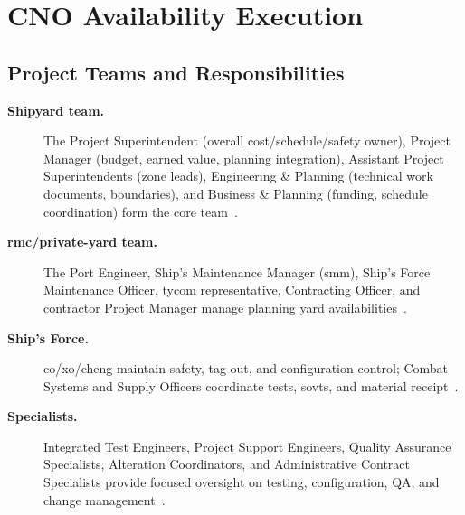 \documentclass[../main.tex]{subfiles}
\begin{document}
\section{CNO Availability Execution}

\subsection{Project Teams and Responsibilities}
\begin{description}
  \item[\textbf{Shipyard team.}] The Project Superintendent (overall cost/schedule/safety owner), Project Manager (budget, earned value, planning integration), Assistant Project Superintendents (zone leads), Engineering \& Planning (technical work documents, boundaries), and Business \& Planning (funding, schedule coordination) form the core team~\autocite{edo-4-2-2-cno-availability-execution-2025}.
  \item[\textbf{\ac{rmc}/private-yard team.}] The Port Engineer, Ship's Maintenance Manager (\ac{smm}), Ship's Force Maintenance Officer, \ac{tycom} representative, Contracting Officer, and contractor Project Manager manage planning yard availabilities~\autocite{edo-4-2-2-cno-availability-execution-2025}.
  \item[\textbf{Ship's Force.}] \ac{co}/\ac{xo}/\ac{cheng} maintain safety, tag-out, and configuration control; Combat Systems and Supply Officers coordinate tests, \acp{sovt}, and material receipt~\autocite{COMFLTFORCOMINST4790-3}.
  \item[\textbf{Specialists.}] Integrated Test Engineers, Project Support Engineers, Quality Assurance Specialists, Alteration Coordinators, and Administrative Contract Specialists provide focused oversight on testing, configuration, QA, and change management~\autocite{edo-4-2-2-cno-availability-execution-2025}.
\end{description}
\end{document}
